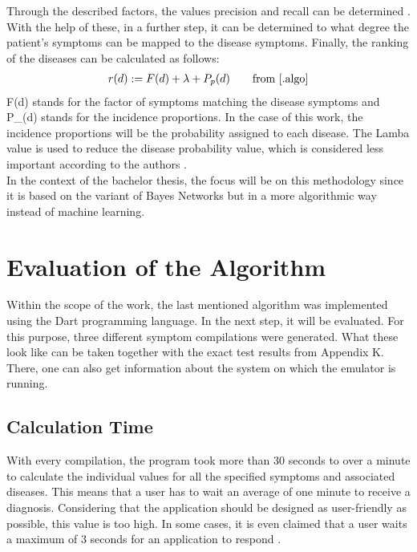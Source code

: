 \noindent
Through the described factors, the values precision and recall can be determined \cite[p. 9]{.algo}. With the help of these, in a further step, it can be determined to what degree the patient's symptoms can be mapped to the disease symptoms. Finally, the ranking of the diseases can be calculated as follows:
\begin{equation}
	\begin{aligned}
		r(d) := F(d) + \lambda + P_p(d)\\
	\end{aligned}\qquad\text{from \cite{.algo}}
\end{equation}
F(d) stands for the factor of symptoms matching the disease symptoms and P\_(d) stands for the incidence proportions. In the case of this work, the incidence proportions will be the probability assigned to each disease. The Lamba value is used to reduce the disease probability value, which is considered less important according to the authors \cite[p. 10]{.algo}. 
\newline \\
In the context of the bachelor thesis, the focus will be on this methodology since it is based on the variant of Bayes Networks but in a more algorithmic way instead of machine learning.


\section{Evaluation of the Algorithm}
Within the scope of the work, the last mentioned algorithm was implemented using the Dart programming language. In the next step, it will be evaluated. For this purpose, three different symptom compilations were generated. What these look like can be taken together with the exact test results from Appendix K. There, one can also get information about the system on which the emulator is running.

\subsection{Calculation Time}
With every compilation, the program took more than 30 seconds to over a minute to calculate the individual values for all the specified symptoms and associated diseases. This means that a user has to wait an average of one minute to receive a diagnosis. Considering that the application should be designed as user-friendly as possible, this value is too high. In some cases, it is even claimed that a user waits a maximum of 3 seconds for an application to respond \cite{.3sek}.

